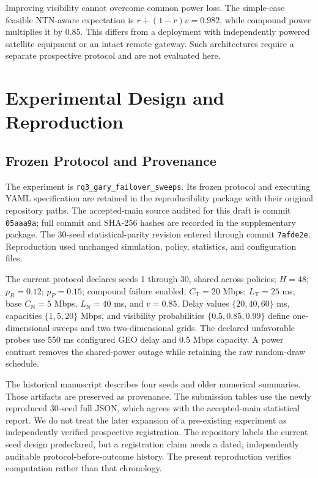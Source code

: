 \documentclass[10pt,twocolumn]{article}
\newcommand{\TN}{\mathrm{T}}
\newcommand{\NTN}{\mathrm{N}}
\begin{document}
Improving visibility cannot overcome common power loss. The simple-case feasible NTN-aware expectation is $r+(1-r)v=0.982$, while compound power multiplies it by 0.85. This differs from a deployment with independently powered satellite equipment or an intact remote gateway. Such architectures require a separate prospective protocol and are not evaluated here.

\section{Experimental Design and Reproduction}
\subsection{Frozen Protocol and Provenance}
The experiment is \texttt{rq3\_gary\_failover\_sweeps}. Its frozen protocol and executing YAML specification are retained in the reproducibility package with their original repository paths. The accepted-main source audited for this draft is commit \texttt{05aaa9a}; full commit and SHA-256 hashes are recorded in the supplementary package. The 30-seed statistical-parity revision entered through commit \texttt{7afde2e}. Reproduction used unchanged simulation, policy, statistics, and configuration files.

The current protocol declares seeds 1 through 30, shared across policies; $H=48$; $p_R=0.12$; $p_P=0.15$; compound failure enabled; $C_\TN=20$ Mbps; $L_\TN=25$ ms; base $C_\NTN=5$ Mbps, $L_\NTN=40$ ms, and $v=0.85$. Delay values $\{20,40,60\}$ ms, capacities $\{1,5,20\}$ Mbps, and visibility probabilities $\{0.5,0.85,0.99\}$ define one-dimensional sweeps and two two-dimensional grids. The declared unfavorable probes use 550 ms configured GEO delay and 0.5 Mbps capacity. A power contrast removes the shared-power outage while retaining the raw random-draw schedule.

The historical manuscript describes four seeds and older numerical summaries. Those artifacts are preserved as provenance. The submission tables use the newly reproduced 30-seed full JSON, which agrees with the accepted-main statistical report. We do not treat the later expansion of a pre-existing experiment as independently verified prospective registration. The repository labels the current seed design predeclared, but a registration claim needs a dated, independently auditable protocol-before-outcome history. The present reproduction verifies computation rather than that chronology.
\end{document}
